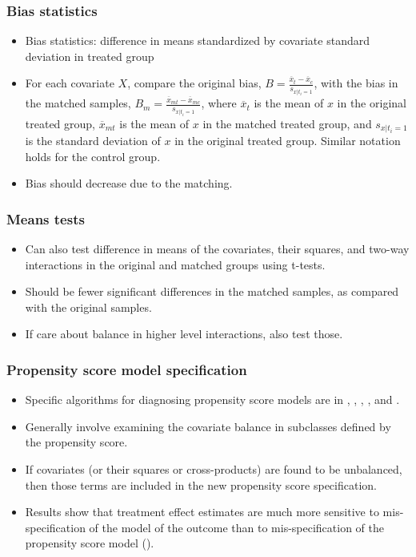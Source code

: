\documentclass[11pt,titlepage]{article}
\begin{document}
\subsubsection{Bias statistics}
\begin{itemize}
\item Bias statistics: difference in means standardized by covariate standard deviation in treated group
\item For each covariate $X$, compare the original bias, $B = \frac{\overline{x}_{t}-\overline{x}_{c}}{s_{x|t_i=1}}$, with the bias in the matched samples,
$B_m = \frac{\overline{x}_{mt}-\overline{x}_{mc}}{s_{x|t_i=1}}$, where ${\overline{x}_t}$ is the mean of $x$ in the original treated group, $\overline{x}_{mt}$ is
the mean of $x$ in the matched treated group, and $s_{x|t_i=1}$ is the standard deviation of $x$ in the original treated group.  Similar notation holds for the 
control group.
\item Bias should decrease due to the matching.
\end{itemize}

\subsubsection{Means tests}
\begin{itemize}
\item Can also test difference in means of the covariates, their squares, and two-way interactions in the original and matched groups using t-tests.  
\item Should be fewer significant differences in the matched samples, as compared with the original samples.
\item If care about balance in higher level interactions, also test those.
\end{itemize}

\subsubsection{Propensity score model specification}
\begin{itemize}
\item Specific algorithms for diagnosing propensity score models are in \cite{RosRub84}, \cite{Perkins00}, \cite{DehWah02},
\cite{MicBloHil04}, and \cite{matchitdocs}. 
\item Generally involve examining the covariate balance in subclasses defined by the propensity score.  
\item If covariates (or their squares or cross-products) are found to be unbalanced, then those terms are included in the new propensity score specification.  
\item Results show that treatment effect estimates are much more sensitive to mis-specification of the model of the outcome than 
to mis-specification of the propensity score model (\cite{Drake93, DehWah99, DehWah02, Zhao04}).
\end{itemize}
\end{document}
